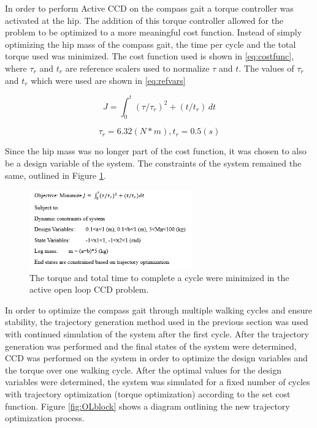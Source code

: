 \documentclass{./springer/svjour3}
\begin{document}
In order to perform Active CCD on the compass gait a torque controller was activated at the hip. The addition of this torque controller allowed
for the problem to be optimized to a more meaningful cost function. Instead of simply optimizing the hip mass of the compass gait, the time per cycle 
and the total torque used was minimized. The cost function used is shown in \ref{eq:costfunc}, where $\tau_r$ and $t_r$ are reference scalers used 
to normalize $\tau$ and $t$. The values of $\tau_r$ and $t_r$ which were used are shown in \ref{eq:refvars}

\begin{equation}
\label{eq:costfunc}
J = 
\int_{0}^{t} (\tau / \tau_r)^2 + (t/t_r) \,dt 
\end{equation}

\begin{equation}
\label{eq:refvars}
\tau_r = 6.32 (N*m), 
t_r = 0.5 (s)
\end{equation}

Since the hip mass was no longer part of the cost function, it was chosen to also 
be a design variable of the system. The constraints of the system remained the same, outlined in Figure \ref{fig:OLprob}.

\begin{figure}[h]
\centering
\includegraphics[width=7cm]{./figures/openloopcontrol.png}
\caption{The torque and total time to complete a cycle were minimized in the active open loop CCD problem.}
\label{fig:OLprob}
\end{figure}

In order to optimize the compass gait through multiple walking cycles and ensure stability, the trajectory generation method used
in the previous section was used with continued simulation of the system after the first cycle.
After the trajectory generation was performed and the final states of the system were determined, CCD was performed on the system in order to
optimize the design variables and the torque over one walking cycle. After the optimal values for the design variables were determined, the system was 
simulated for a fixed number of cycles with trajectory optimization (torque optimization) according to the set cost function. Figure \ref{fig:OLblock}
shows a diagram outlining the new trajectory optimization process.
\end{document}
